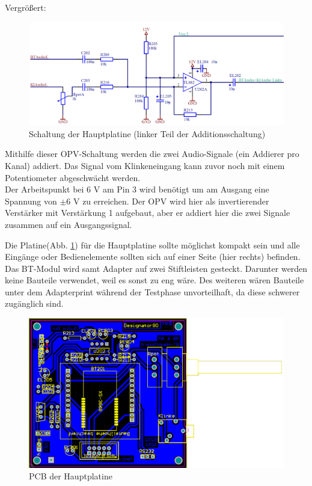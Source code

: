 Vergrößert:
\begin{figure} [H]
	\centering
	\includegraphics[width=1\textwidth]{img/BTModul/hauptboard_sch2_zoom.png}
	\caption{Schaltung der Hauptplatine (linker Teil der Additionsschaltung)}
\end{figure}
Mithilfe dieser OPV-Schaltung werden die zwei Audio-Signale (ein Addierer pro Kanal) addiert.
Das Signal vom Klinkeneingang kann zuvor noch mit einem Potentiometer abgeschwächt werden.
\\
Der Arbeitspunkt bei 6 V am Pin 3 wird benötigt um am Ausgang eine Spannung von $\pm$6 V zu erreichen. Der OPV wird hier als invertierender Verstärker mit Verstärkung 1 aufgebaut, aber er addiert hier die zwei Signale zusammen auf ein Ausgangssignal.
\newpage

Die Platine(Abb. \ref {fig:5.3.8.3.1}) für die Hauptplatine sollte möglichst kompakt sein und alle Eingänge oder Bedienelemente sollten sich auf einer Seite (hier rechts) befinden.
Das BT-Modul wird samt Adapter auf zwei Stiftleisten gesteckt.
Darunter werden keine Bauteile verwendet, weil es sonst zu eng wäre.
Des weiteren wären Bauteile unter dem Adapterprint während der Testphase unvorteilhaft, da diese schwerer zugänglich sind.
\begin{figure} [H]
	\centering
	\includegraphics[width=1\textwidth]{img/BTModul/hauptboard_pcb.png}
	\caption{PCB der Hauptplatine}\label {fig:5.3.8.3.1}
\end{figure}
\newpage


